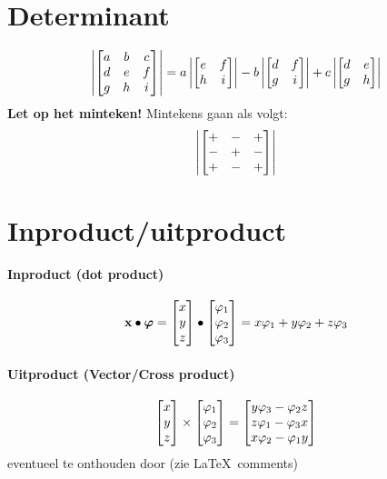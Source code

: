\documentclass{article}
\begin{document}
    \section{Determinant}\label{sec:determinant}

    \[
        \det{
        a & b & c \\
        d & e & f \\
        g & h & i \\
        }
        = a \det{e & f \\ h & i} - b \det{d & f \\ g & i} + c \det{d & e \\ g & h}
    \]
    \textbf{Let op het minteken!} Mintekens gaan als volgt:
    \[
        \det{
        + & - & + \\
        - & + & - \\
        + & - & +
        }
    \]
    \section{Inproduct/uitproduct}\label{sec:inproduct/uitproduct}
    \paragraph{Inproduct (dot product)}
    \[ \x \bullet \bm \phi = \matrix{x \\ y \\ z} \bullet \matrix{\phi_1 \\ \phi_2 \\\phi_3} = x \phi_1 + y \phi_2 + z \phi_3 \]
    \paragraph{Uitproduct (Vector/Cross product)}
    \[ \matrix{x \\ y \\ z} \times \matrix{\phi_1 \\ \phi_2 \\\phi_3} = \matrix{y \phi_3 - \phi_2 z \\ z \phi_1 - \phi_3 x \\ x \phi_2 - \phi_1 y}  \]
    eventueel te onthouden door (zie \LaTeX\ comments)

\end{document}
